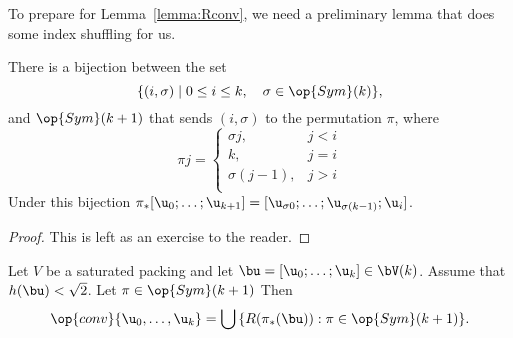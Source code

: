 To prepare for Lemma~\ref{lemma:Rconv}, we need a preliminary lemma that
does some index shuffling for us.

\begin{lemma}[]\label{lemma:coset-bijection} 
There is a bijection between the set 
\begin{displaymath} 
\{(i,\sigma)\mid 0\le i\le k,\quad \sigma\in \op{Sym}(k)\},
\end{displaymath}
and $\op{Sym}(k+1)$ 
that sends $(i,\sigma)$ to the permutation $\pi$, where
\begin{displaymath} 
\pi j = \begin{cases} 
\sigma j, &j<i\\
k,&j=i\\
\sigma({j-1}),&j>i\\
\end{cases}
\end{displaymath}
Under this bijection $\pi_*[\u_0;\ldots;\u_{k+1}]=[\u_{\sigma 0};\ldots;\u_{\sigma (k-1)};\u_i]$.
\end{lemma}

\begin{proof} 
This is left as an exercise to the reader.
\end{proof}

\begin{lemma}[]\label{lemma:Rconv}  
  Let $V$ be a saturated packing and let $\bu = [\u_0;\ldots;\u_k]\in
  \bV(k)$.  Assume that $h(\bu)<\sqrt2$.  Let $\pi\in\op{Sym}(k+1)$
  Then
\begin{displaymath} 
\op{conv}\{ \u_0,\ldots, \u_k\} = \bigcup \,\{ R(\pi_*(\bu)) : \pi\in \op{Sym}(k+1)\}.
\end{displaymath}
\end{lemma}
%

